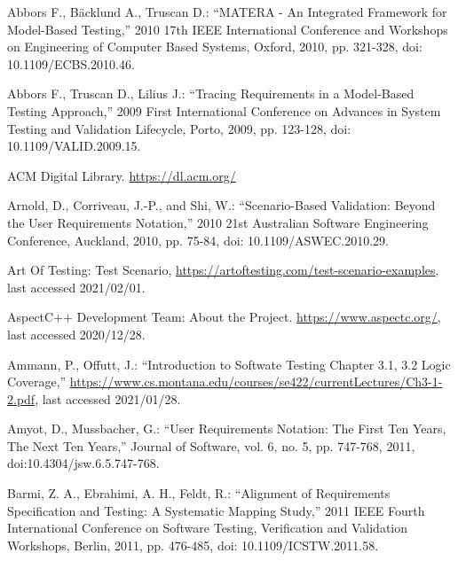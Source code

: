 \documentclass[a4paper,10pt, bibliography=totocnumbered]{scrreprt}
\begin{document}
\begin{thebibliography}{9}

 Abbors F., Bäcklund A., Truscan D.: \enquote{MATERA - An Integrated Framework for Model-Based Testing,} 2010 17th IEEE International Conference and Workshops on Engineering of Computer Based Systems, Oxford, 2010, pp. 321-328, doi: 10.1109/ECBS.2010.46.

 Abbors F., Truscan D., Lilius J.: \enquote{Tracing Requirements in a Model-Based Testing Approach,} 2009 First International Conference on Advances in System Testing and Validation Lifecycle, Porto, 2009, pp. 123-128, doi: 10.1109/VALID.2009.15.

 ACM Digital Library. \url{https://dl.acm.org/} 

 Arnold, D., Corriveau, J.-P., and Shi, W.: \enquote{Scenario-Based Validation: Beyond the User Requirements Notation,} 2010 21st Australian Software Engineering Conference, Auckland, 2010, pp. 75-84, doi: 10.1109/ASWEC.2010.29.

 Art Of Testing: Test Scenario, \url{https://artoftesting.com/test-scenario-examples}, last accessed 2021/02/01.

 AspectC++ Development Team: About the Project.
\url{https://www.aspectc.org/}, last accessed 2020/12/28.

 Ammann, P., Offutt, J.: \enquote{Introduction to Softwate Testing Chapter 3.1, 3.2 Logic Coverage,} \url{https://www.cs.montana.edu/courses/se422/currentLectures/Ch3-1-2.pdf}, last accessed 2021/01/28.

 Amyot, D., Mussbacher, G.: \enquote{User Requirements Notation: The First Ten Years, The Next Ten Years,} Journal of Software, vol. 6, no. 5, pp. 747-768, 2011, doi:10.4304/jsw.6.5.747-768.

 Barmi, Z. A., Ebrahimi, A. H., Feldt, R.: \enquote{Alignment of Requirements Specification and Testing: A Systematic Mapping Study,} 2011 IEEE Fourth International Conference on Software Testing, Verification and Validation Workshops, Berlin, 2011, pp. 476-485, doi: 10.1109/ICSTW.2011.58.



\end{thebibliography}
\end{document}
